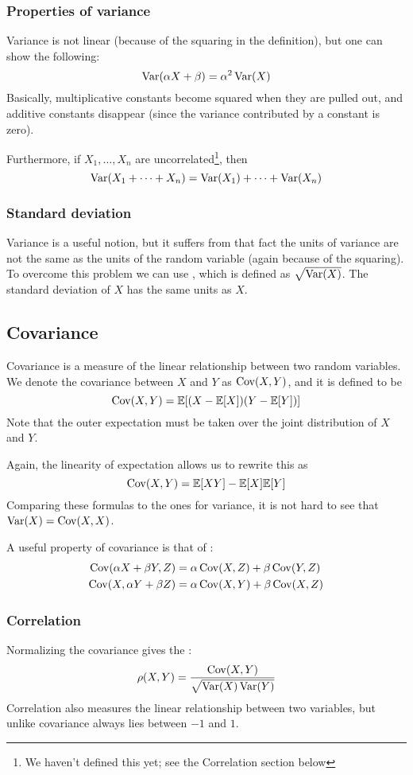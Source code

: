 \subsubsection{Properties of variance}
Variance is not linear (because of the squaring in the definition), but one can show the following:
\[\operatorname{Var}(\alpha X + \beta) = \alpha^2 \operatorname{Var}(X)\]
Basically, multiplicative constants become squared when they are pulled out, and additive constants disappear (since the variance contributed by a constant is zero).

Furthermore, if $X_1, \dots, X_n$ are uncorrelated\footnote{
    We haven't defined this yet; see the Correlation section below
}, then
\[\operatorname{Var}(X_1 + \dots + X_n) = \operatorname{Var}(X_1) + \dots + \operatorname{Var}(X_n)\]

\subsubsection{Standard deviation}
Variance is a useful notion, but it suffers from that fact the units of variance are not the same as the units of the random variable (again because of the squaring).
To overcome this problem we can use , which is defined as $\sqrt{\operatorname{Var}(X)}$.
The standard deviation of $X$ has the same units as $X$.

\subsection{Covariance}
Covariance is a measure of the linear relationship between two random variables.
We denote the covariance between $X$ and $Y$ as $\operatorname{Cov}(X, Y)$, and it is defined to be
\[\operatorname{Cov}(X, Y) = \mathbb{E}[(X-\mathbb{E}[X])(Y-\mathbb{E}[Y])]\]
Note that the outer expectation must be taken over the joint distribution of $X$ and $Y$.

Again, the linearity of expectation allows us to rewrite this as
\[\operatorname{Cov}(X, Y) = \mathbb{E}[XY] - \mathbb{E}[X]\mathbb{E}[Y]\]
Comparing these formulas to the ones for variance, it is not hard to see that $\operatorname{Var}(X) = \operatorname{Cov}(X, X)$.

A useful property of covariance is that of :
\begin{align*}
\operatorname{Cov}(\alpha X + \beta Y, Z) &= \alpha\operatorname{Cov}(X, Z) + \beta\operatorname{Cov}(Y, Z) \\
\operatorname{Cov}(X, \alpha Y + \beta Z) &= \alpha\operatorname{Cov}(X, Y) + \beta\operatorname{Cov}(X, Z)
\end{align*}

\subsubsection{Correlation}
Normalizing the covariance gives the :
\[\rho(X, Y) = \frac{\operatorname{Cov}(X, Y)}{\sqrt{\operatorname{Var}(X)\operatorname{Var}(Y)}}\]
Correlation also measures the linear relationship between two variables, but unlike covariance always lies between $-1$ and $1$.

